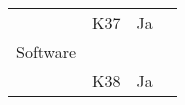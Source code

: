 \documentclass[class=article, crop=false]{standalone}
\begin{document}
\begin{table}[]
\begin{tabular}{llll}
            & K37            & Ja                 &                                                                                                                                                                                                    \\
            Software        &                &                    &                                                                                                                                                                                                    \\
            & K38            & Ja                 &
        \end{tabular}
    \end{table}
\end{document}
